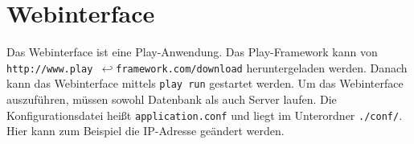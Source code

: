\section{Webinterface}

Das Webinterface ist eine Play-Anwendung. Das Play-Framework kann von  \texttt{http://www.play~$\hookleftarrow$\linebreak framework.com/download} heruntergeladen werden. Danach kann das Webinterface mittels \texttt{play run} gestartet werden. Um das Webinterface auszuführen, müssen sowohl Datenbank als auch Server laufen. Die Konfigurationsdatei heißt \texttt{application.conf} und liegt im Unterordner \texttt{./conf/}. Hier kann zum Beispiel die IP-Adresse geändert werden.